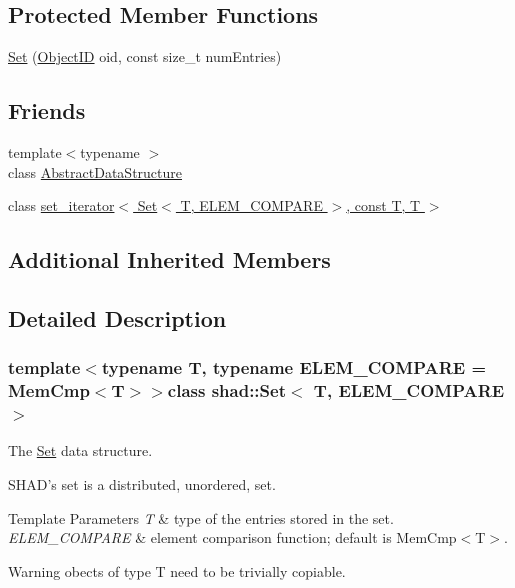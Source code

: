 \subsection*{Protected Member Functions}
\begin{DoxyCompactItemize}
\item 
\hyperlink{classshad_1_1Set_af23f31404ceabcf8c495c8dd77842c14}{Set} (\hyperlink{classshad_1_1Set_a05ba25e24c892602d707b21e3e4300b9}{Object\-I\-D} oid, const size\-\_\-t num\-Entries)
\end{DoxyCompactItemize}
\subsection*{Friends}
\begin{DoxyCompactItemize}
\item 
{\footnotesize template$<$typename $>$ }\\class \hyperlink{classshad_1_1Set_ab18afa4496cc863ddc11bab94b2adf57}{Abstract\-Data\-Structure}
\item 
class \hyperlink{classshad_1_1Set_a98fe017bca451c95c75b7e3d03b3d15a}{set\-\_\-iterator$<$ Set$<$ T, E\-L\-E\-M\-\_\-\-C\-O\-M\-P\-A\-R\-E $>$, const T, T $>$}
\end{DoxyCompactItemize}
\subsection*{Additional Inherited Members}


\subsection{Detailed Description}
\subsubsection*{template$<$typename T, typename E\-L\-E\-M\-\_\-\-C\-O\-M\-P\-A\-R\-E = Mem\-Cmp$<$\-T$>$$>$class shad\-::\-Set$<$ T, E\-L\-E\-M\-\_\-\-C\-O\-M\-P\-A\-R\-E $>$}

The \hyperlink{classshad_1_1Set}{Set} data structure. 

S\-H\-A\-D's set is a distributed, unordered, set. 
\begin{DoxyTemplParams}{Template Parameters}
{\em T} & type of the entries stored in the set. \\
\hline
{\em E\-L\-E\-M\-\_\-\-C\-O\-M\-P\-A\-R\-E} & element comparison function; default is Mem\-Cmp$<$\-T$>$. \\
\hline
\end{DoxyTemplParams}
\begin{DoxyWarning}{Warning}
obects of type T need to be trivially copiable. 
\end{DoxyWarning}


